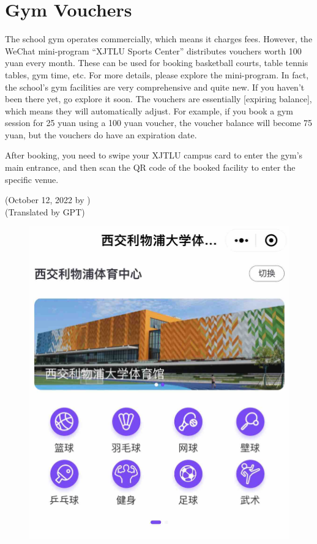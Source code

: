 \section{Gym Vouchers}
\begin{minipage}[t]{0.5\textwidth}
    The school gym operates commercially, which means it charges fees. However, the WeChat mini-program “XJTLU Sports Center” distributes vouchers worth 100 yuan every month. These can be used for booking basketball courts, table tennis tables, gym time, etc. For more details, please explore the mini-program. In fact, the school’s gym facilities are very comprehensive and quite new. If you haven’t been there yet, go explore it soon. The vouchers are essentially [expiring balance], which means they will automatically adjust. For example, if you book a gym session for 25 yuan using a 100 yuan voucher, the voucher balance will become 75 yuan, but the vouchers do have an expiration date.

    After booking, you need to swipe your XJTLU campus card to enter the gym’s main entrance, and then scan the QR code of the booked facility to enter the specific venue.

    \begin{flushright}
    (October 12, 2022 by \Wu) \\
    (Translated by GPT)
    \end{flushright}
\end{minipage}
\begin{minipage}[t]{0.45\textwidth}
    \begin{figure}[H]
        \includegraphics[width=0.95\columnwidth, right]{author-folder/Kai.Wu/sportcenter_miniprogram.jpg}
    \end{figure}
\end{minipage}

